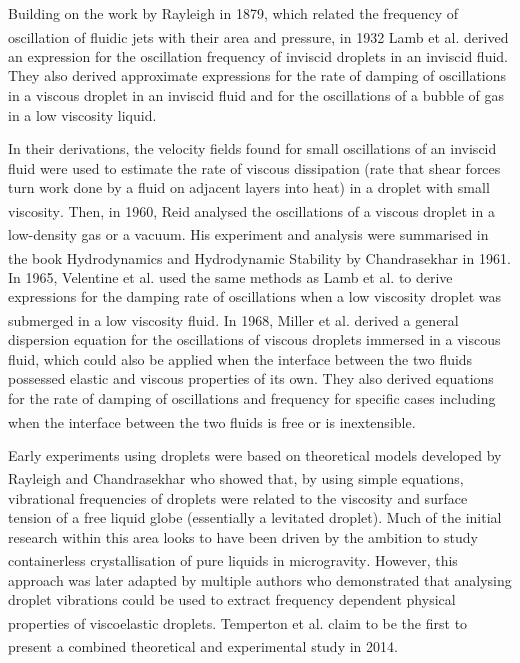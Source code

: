 \documentclass{physics_article_B}
\begin{document}
Building on the work by Rayleigh in 1879, which related the frequency of oscillation of fluidic jets with their area and pressure\textsuperscript{\cite{rayleigh}}, in 1932 Lamb et al. derived an expression for the oscillation frequency of inviscid droplets in an inviscid fluid. They also derived approximate expressions for the rate of damping of oscillations in a viscous droplet in an inviscid fluid and for the oscillations of a bubble of gas in a low viscosity liquid. 

In their derivations, the velocity fields found for small oscillations of an inviscid fluid were used to estimate the rate of viscous dissipation (rate that shear forces turn work done by a fluid on adjacent layers into heat) in a droplet with small viscosity\textsuperscript{\cite{lamb}}. Then, in 1960, Reid analysed the oscillations of a viscous droplet in a low-density gas or a vacuum\textsuperscript{\cite{reid}}. His experiment and analysis were summarised in the book Hydrodynamics and Hydrodynamic Stability by Chandrasekhar in 1961\textsuperscript{\cite{chandrasekhar}}. In 1965, Velentine et al. used the same methods as Lamb et al. to derive expressions for the damping rate of oscillations when a low viscosity droplet was submerged in a low viscosity fluid\textsuperscript{\cite{velentine}}. In 1968, Miller et al. derived a general dispersion equation for the oscillations of viscous droplets immersed in a viscous fluid, which could also be applied when the interface between the two fluids possessed elastic and viscous properties of its own. They also derived equations for the  rate of damping of oscillations and frequency for specific cases including when the interface between the two fluids is free or is inextensible\textsuperscript{\cite{miller}}.

Early experiments using droplets were based on theoretical models developed by Rayleigh\textsuperscript{\cite{rayleigh}} and Chandrasekhar\textsuperscript{\cite{chandrasekhar2}} who showed that, by using simple equations, vibrational frequencies of droplets were related to the viscosity and surface tension of a free liquid globe (essentially a levitated droplet). Much of the initial research within this area looks to have been driven by the ambition to study containerless crystallisation of pure liquids in microgravity\textsuperscript{\cite{wilkes}}. However, this approach was later adapted by multiple authors who demonstrated that analysing droplet vibrations could be used to extract frequency dependent physical properties of viscoelastic droplets\textsuperscript{\cite{egry}}. Temperton et al. claim to be the first to present a combined theoretical and experimental study in 2014\textsuperscript{\cite{temperton}}.
\end{document}
